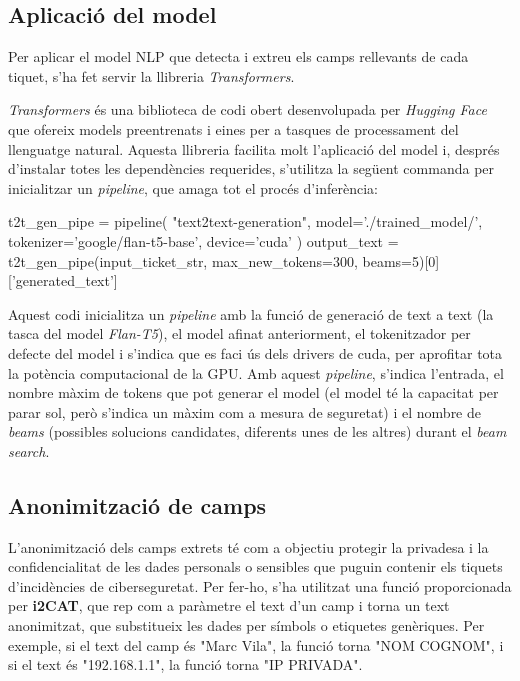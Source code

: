 \subsection{Aplicació del model}
Per aplicar el model NLP que detecta i extreu els camps rellevants de cada tiquet, s'ha fet servir la llibreria \textit{Transformers}.

\textit{Transformers} és una biblioteca de codi obert desenvolupada per \textit{Hugging Face} \cite{Hugging-Face} que ofereix models preentrenats i eines per a tasques de processament del llenguatge natural. Aquesta llibreria facilita molt l'aplicació del model i, després d'instalar totes les dependències requerides, s'utilitza la següent commanda per inicialitzar un \textit{pipeline}, que amaga tot el procés d'inferència:

\begin{python}
t2t_gen_pipe = pipeline(
     "text2text-generation",
     model='./trained_model/',
     tokenizer='google/flan-t5-base',
     device='cuda'
     )     
output_text = t2t_gen_pipe(input_ticket_str, max_new_tokens=300, beams=5)[0]['generated_text']
\end{python}

Aquest codi inicialitza un \textit{pipeline} amb la funció de generació de text a text (la tasca del model \textit{Flan-T5}), el model afinat anteriorment, el tokenitzador per defecte del model i s'indica que es faci ús dels drivers de cuda, per aprofitar tota la potència computacional de la GPU. Amb aquest \textit{pipeline}, s'indica l'entrada, el nombre màxim de tokens que pot generar el model (el model té la capacitat per parar sol, però s'indica un màxim com a mesura de seguretat) i el nombre de \textit{beams} (possibles solucions candidates, diferents unes de les altres) durant el \textit{beam search}.


\subsection{Anonimització de camps}
L'anonimització dels camps extrets té com a objectiu protegir la privadesa i la confidencialitat de les dades personals o sensibles que puguin contenir els tiquets d'incidències de ciberseguretat. Per fer-ho, s'ha utilitzat una funció proporcionada per \textbf{i2CAT}, que rep com a paràmetre el text d'un camp i torna un text anonimitzat, que substitueix les dades per símbols o etiquetes genèriques. Per exemple, si el text del camp és "Marc Vila", la funció torna "NOM COGNOM", i si el text és "192.168.1.1", la funció torna "IP PRIVADA".

